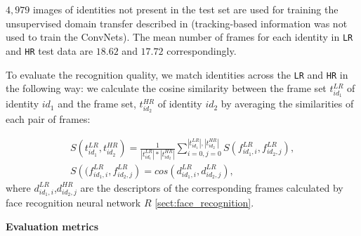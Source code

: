 $4,979$ images of identities not present in the test set are used for training the unsupervised domain transfer described in  (tracking-based information was not used to train the ConvNets). The mean number of frames for each identity in \texttt{LR} and \texttt{HR} test data are $18.62$ and $17.72$ correspondingly.
 
 
  To evaluate the recognition quality, we match identities across the \texttt{LR} and \texttt{HR} in the following way: we calculate the cosine similarity between the frame set $t_{id_1}^{LR}$ of identity $id_1$ and the frame set, $t_{id_2}^{HR}$ of identity $id_2$ by averaging the similarities of each pair of frames: 

 \begin{align}
     S \left(t_{id_1}^{LR},t_{id_2}^{HR}\right) = \frac {1} { |t_{id_1}^{LR}|*|t_{id_2}^{HR}|}\sum_{i=0, j= 0}^{|t_{id_1}^{LR}|, |t_{id_2}^{HR}|} S \left(f_{id_1,i}^{LR},f_{id_2,j}^{LR} \right), \\
     S\left((f_{id_1,i}^{LR},f_{id_2,j}^{LR}\right) =  cos\left(d_{id_1,i}^{LR},d_{id_2,j}^{LR}\right),
 \end{align}
 where $d_{id_1,i}^{LR}$,$d_{id_2,j}^{HR}$ are the descriptors of the corresponding frames calculated by face recognition neural network $R$ \ref{sect:face_recognition}.



\bigskip\indent\textbf{Evaluation metrics}\\

